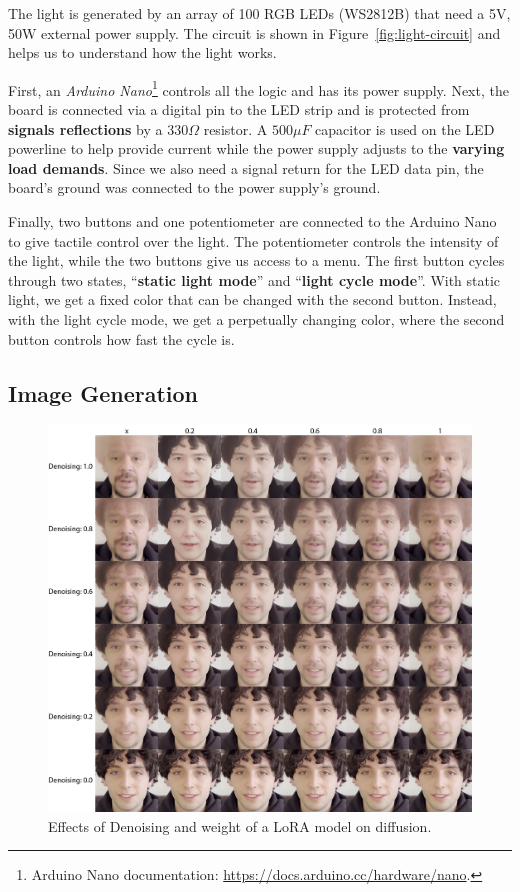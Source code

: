 \documentclass[preprint]{elsarticle}
\begin{document}
The light is generated by an array of 100 RGB LEDs (WS2812B) that need a 5V, 50W external power supply. 
The circuit is shown in Figure~\ref{fig:light-circuit} and helps us to understand how the light works. 

First, an \emph{Arduino Nano}\footnote{Arduino Nano documentation: \url{https://docs.arduino.cc/hardware/nano}.} controls all the logic and has its power supply.  Next, the board is connected via a digital pin to the LED strip and is protected  from \textbf{signals reflections} by a $330\Omega$ resistor. A $500 \mu F$ capacitor is used on the LED powerline to help provide current 
while the power supply adjusts to the \textbf{varying load demands}. Since we also need a signal return for the LED data pin, the board's ground was  connected to the power supply's ground. 

Finally, two buttons and one potentiometer are connected to the Arduino Nano to give tactile control over the light.  The potentiometer controls the intensity of the light, while the two buttons give us access to a menu. The first button cycles through two states, ``\textbf{static light mode}'' and ``\textbf{light cycle mode}''.  With static light, we get a fixed color that can be changed with the second button. Instead, with the light cycle mode, we get a perpetually changing color, where the second button controls how fast the cycle is.



\subsection{Image Generation}

\begin{figure}[H]
	\centering
	\includegraphics[width=\textwidth, keepaspectratio]{img/project_img/grid-santini.png}
	\caption{Effects of Denoising and weight of a LoRA model on diffusion.}
	\label{fig:grid-santini}
\end{figure}
\end{document}
